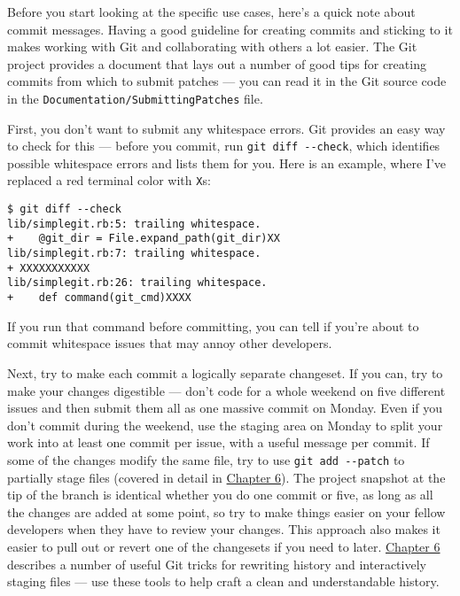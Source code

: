 \documentclass[a4paper]{book}
\newcommand{\prechap}{Chapter }
\newcommand{\postchap}{}
\newcommand{\chapref}[1]{\hyperref[chap:#1]{\prechap #1\postchap}}
\begin{document}
Before you start looking at the specific use cases, here's a quick note about commit messages. Having a good guideline for creating commits and sticking to it makes working with Git and collaborating with others a lot easier. The Git project provides a document that lays out a number of good tips for creating commits from which to submit patches --- you can read it in the Git source code in the \texttt{Documentation/SubmittingPatches} file.

First, you don't want to submit any whitespace errors. Git provides an easy way to check for this --- before you commit, run \texttt{git diff -{}-check}, which identifies possible whitespace errors and lists them for you. Here is an example, where I've replaced a red terminal color with \texttt{X}s:

\begin{shaded}\begin{verbatim}
$ git diff --check
lib/simplegit.rb:5: trailing whitespace.
+    @git_dir = File.expand_path(git_dir)XX
lib/simplegit.rb:7: trailing whitespace.
+ XXXXXXXXXXX
lib/simplegit.rb:26: trailing whitespace.
+    def command(git_cmd)XXXX
\end{verbatim}\end{shaded}

If you run that command before committing, you can tell if you're about to commit whitespace issues that may annoy other developers.

Next, try to make each commit a logically separate changeset. If you can, try to make your changes digestible --- don't code for a whole weekend on five different issues and then submit them all as one massive commit on Monday. Even if you don't commit during the weekend, use the staging area on Monday to split your work into at least one commit per issue, with a useful message per commit. If some of the changes modify the same file, try to use \texttt{git add -{}-patch} to partially stage files (covered in detail in \chapref{6}). The project snapshot at the tip of the branch is identical whether you do one commit or five, as long as all the changes are added at some point, so try to make things easier on your fellow developers when they have to review your changes. This approach also makes it easier to pull out or revert one of the changesets if you need to later. \chapref{6} describes a number of useful Git tricks for rewriting history and interactively staging files --- use these tools to help craft a clean and understandable history.
\end{document}

